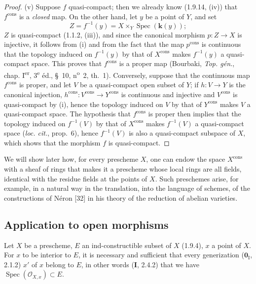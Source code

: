 \begin{proof}
(v) Suppose $f$ quasi-compact; then we already know (1.9.14, (iv)) that
$f^{\mathrm{cons}}$ is a \emph{closed} map. On the other hand, let $y$ be a
point of $Y$, and set
\[
  Z=f^{-1}(y)=X\times_Y\operatorname{Spec}(\boldsymbol{k}(y));
\]
$Z$ is quasi-compact (1.1.2, (iii)), and since the canonical morphism
$p:Z\to X$ is injective, it follows from (i) and from the fact that the map
$p^{\mathrm{cons}}$ is continuous that the topology induced on $f^{-1}(y)$
by that of $X^{\mathrm{cons}}$ makes $f^{-1}(y)$ a quasi-compact space.
This proves that $f^{\mathrm{cons}}$ is a proper map (Bourbaki,
\emph{Top. gén.}, chap. I\textsuperscript{er}, 3\textsuperscript{e} éd.,
\S~10, n\textsuperscript{o}~2, th.~1). Conversely, suppose that
the continuous map $f^{\mathrm{cons}}$ is proper, and let $V$ be a
quasi-compact open subset of $Y$; if $h:V\to Y$ is the canonical injection,
$h^{\mathrm{cons}}:V^{\mathrm{cons}}\to Y^{\mathrm{cons}}$ is continuous and
injective and $V^{\mathrm{cons}}$ is quasi-compact by (i), hence the topology
induced on $V$ by that of $Y^{\mathrm{cons}}$ makes $V$ a
quasi-compact space. The hypothesis that $f^{\mathrm{cons}}$ is proper then
implies that the topology induced on $f^{-1}(V)$ by that of
$X^{\mathrm{cons}}$ makes $f^{-1}(V)$ a quasi-compact space
(\emph{loc. cit.}, prop.~6), hence $f^{-1}(V)$ is also a quasi-compact
subspace of $X$, which shows that the morphism $f$ is quasi-compact.
\end{proof}

\begin{env}[1.9.16]
\label{IV.1.9.16}
We will show later how, for every prescheme $X$, one can endow the space
$X^{\mathrm{cons}}$ with a sheaf of rings that makes it a prescheme
whose local rings are all fields, identical with the residue fields at the
points of $X$. Such preschemes arise, for example, in a natural way in the
translation, into the language of schemes, of the constructions of
Néron [32] in his theory of the reduction of abelian varieties.
\end{env}


\subsection{Application to open morphisms}
\label{subsection:IV.1.10}

\begin{theorem}[1.10.1]
\label{IV.1.10.1}
Let $X$ be a prescheme, $E$ an ind-constructible subset of $X$ (1.9.4), $x$
a point of $X$. For $x$ to be interior to $E$, it is necessary and
sufficient that every generization \textup{($\mathbf{0}_{\mathrm I}$, 2.1.2)} $x'$ of $x$
belong to $E$, in other words \textup{(\textbf{I}, 2.4.2)} that we have
$\operatorname{Spec}(\mathcal O_{X,x})\subset E$.
\end{theorem}

